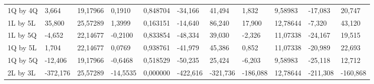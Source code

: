 \begin{table}[H]
{\begin{tabular}{lllllllllll}
\rowcolor[HTML]{FFFFFF} 
{\color[HTML]{000000} 1Q by 4Q}       & {\color[HTML]{000000} 3,664}    & {\color[HTML]{000000} 19,17966} & {\color[HTML]{000000} 0,1910}   & {\color[HTML]{000000} 0,848704} & {\color[HTML]{000000} -34,166}        & {\color[HTML]{000000} 41,494}         & {\color[HTML]{000000} 1,832}    & {\color[HTML]{000000} 9,58983}       & {\color[HTML]{000000} -17,083}        & {\color[HTML]{000000} 20,747}         \\
\rowcolor[HTML]{FFFFFF} 
{\color[HTML]{000000} 1L by 5L}       & {\color[HTML]{000000} 35,800}   & {\color[HTML]{000000} 25,57289} & {\color[HTML]{000000} 1,3999}   & {\color[HTML]{000000} 0,163151} & {\color[HTML]{000000} -14,640}        & {\color[HTML]{000000} 86,240}         & {\color[HTML]{000000} 17,900}   & {\color[HTML]{000000} 12,78644}      & {\color[HTML]{000000} -7,320}         & {\color[HTML]{000000} 43,120}         \\
\rowcolor[HTML]{FFFFFF} 
{\color[HTML]{000000} 1L by 5Q}       & {\color[HTML]{000000} -4,652}   & {\color[HTML]{000000} 22,14677} & {\color[HTML]{000000} -0,2100}  & {\color[HTML]{000000} 0,833854} & {\color[HTML]{000000} -48,334}        & {\color[HTML]{000000} 39,030}         & {\color[HTML]{000000} -2,326}   & {\color[HTML]{000000} 11,07338}      & {\color[HTML]{000000} -24,167}        & {\color[HTML]{000000} 19,515}         \\
\rowcolor[HTML]{FFFFFF} 
{\color[HTML]{000000} 1Q by 5L}       & {\color[HTML]{000000} 1,704}    & {\color[HTML]{000000} 22,14677} & {\color[HTML]{000000} 0,0769}   & {\color[HTML]{000000} 0,938761} & {\color[HTML]{000000} -41,979}        & {\color[HTML]{000000} 45,386}         & {\color[HTML]{000000} 0,852}    & {\color[HTML]{000000} 11,07338}      & {\color[HTML]{000000} -20,989}        & {\color[HTML]{000000} 22,693}         \\
\rowcolor[HTML]{FFFFFF} 
{\color[HTML]{000000} 1Q by 5Q}       & {\color[HTML]{000000} -12,406}  & {\color[HTML]{000000} 19,17966} & {\color[HTML]{000000} -0,6468}  & {\color[HTML]{000000} 0,518529} & {\color[HTML]{000000} -50,235}        & {\color[HTML]{000000} 25,424}         & {\color[HTML]{000000} -6,203}   & {\color[HTML]{000000} 9,58983}       & {\color[HTML]{000000} -25,118}        & {\color[HTML]{000000} 12,712}         \\
\rowcolor[HTML]{FFFFFF} 
{\color[HTML]{000000} 2L by 3L}       & {\color[HTML]{FF0000} -372,176} & {\color[HTML]{FF0000} 25,57289} & {\color[HTML]{FF0000} -14,5535} & {\color[HTML]{FF0000} 0,000000} & {\color[HTML]{FF0000} -422,616}       & {\color[HTML]{FF0000} -321,736}       & {\color[HTML]{FF0000} -186,088} & {\color[HTML]{FF0000} 12,78644}      & {\color[HTML]{FF0000} -211,308}       & {\color[HTML]{FF0000} -160,868}       \\

\end{tabular}}
\end{table}
